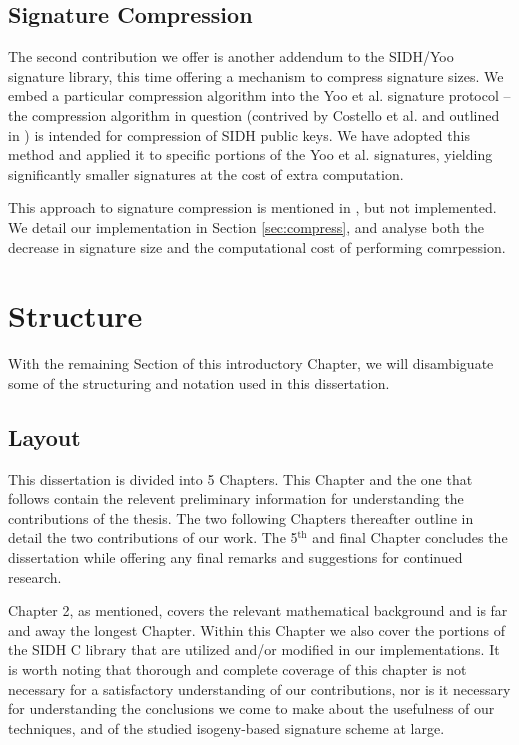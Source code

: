 \subsection{Signature Compression}

The second contribution we offer is another addendum to the SIDH/Yoo signature library, this time offering a mechanism to  compress signature sizes.  We embed a particular compression algorithm into the Yoo et al. signature protocol -- the compression algorithm in question (contrived by Costello et al. and outlined in \cite{pkcomp}) is intended for compression of SIDH public keys. We have adopted this method and applied it to specific portions of the Yoo et al. signatures, yielding significantly smaller signatures at the cost of extra computation.

This approach to signature compression is mentioned in \cite{yoo}, but not implemented. We detail our implementation in Section \ref{sec:compress}, and analyse both the decrease in signature size and the computational cost of performing comrpession. 

\section{Structure}

With the remaining Section of this introductory Chapter, we will disambiguate some of the structuring and notation used in this dissertation.

\subsection{Layout}

This dissertation is divided into 5 Chapters. This Chapter and the one that follows contain the relevent preliminary information for understanding the contributions of the thesis. The two following Chapters thereafter outline in detail the two contributions of our work. The 5$^{\text{th}}$ and final Chapter concludes the dissertation while offering any final remarks and suggestions for continued research.

Chapter 2, as mentioned, covers the relevant mathematical background and is far and away the longest Chapter. Within this Chapter we also cover the portions of the SIDH C library that are utilized and/or modified in our implementations. It is worth noting that thorough and complete coverage of this chapter is not necessary for a satisfactory understanding of our contributions, nor is it necessary for understanding the conclusions we come to make about the usefulness of our techniques, and of the studied isogeny-based signature scheme at large.

